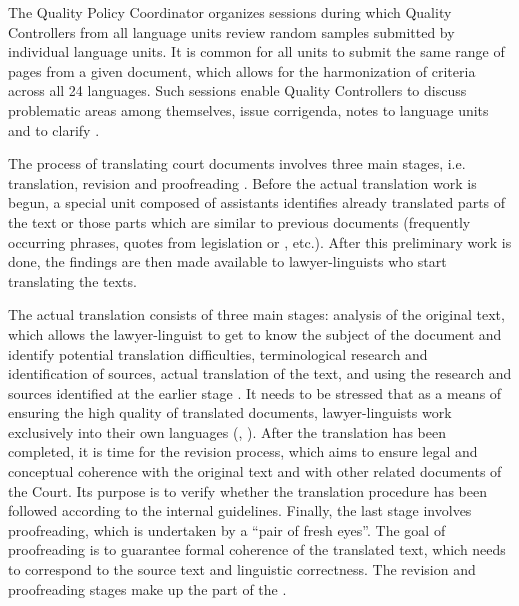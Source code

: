 \documentclass[output=paper]{langsci/langscibook}
\begin{document}
The Quality Policy Coordinator organizes sessions during which Quality Controllers from all language units review random samples submitted by individual language units. It is common for all units to submit the same range of pages from a given document, which allows for the harmonization of criteria across all 24 languages. Such sessions enable Quality Controllers to discuss problematic areas among themselves, issue corrigenda,  notes to language units and to clarify .

The process of translating court documents involves three main stages, i.e. translation, revision and proofreading \citep{Izzo2014b}. Before the actual translation work is begun, a special unit composed of assistants identifies already translated parts of the text or those parts which are similar to previous documents (frequently occurring phrases, quotes from legislation or , etc.). After this preliminary work is done, the findings are then made available to lawyer-linguists who start translating the texts.

The actual translation consists of three main stages: analysis of the original text, which allows the lawyer-linguist to get to know the subject of the document and identify potential translation difficulties, terminological research and identification of sources, actual translation of the text, and using the research and sources identified at the earlier stage \citep{Izzo2014b}. It needs to be stressed that as a means of ensuring the high quality of translated documents, lawyer-linguists work exclusively into their own languages (\citealt[201]{Šarčević2013}, \citealt[15]{McAuliffe2016}). After the translation has been completed, it is time for the revision process, which aims to ensure legal and conceptual coherence with the original text and with other related documents of the Court. Its purpose is to verify whether the translation procedure has been followed according to the internal guidelines. Finally, the last stage involves proofreading, which is undertaken by a “pair of fresh eyes”. The goal of proofreading is to guarantee formal coherence of the translated text, which needs to correspond to the source text and linguistic correctness. The revision and proofreading stages make up the  part of the .
\end{document}
